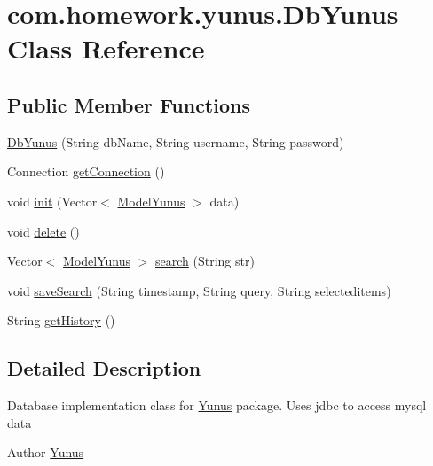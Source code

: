 \hypertarget{classcom_1_1homework_1_1yunus_1_1_db_yunus}{}\section{com.\+homework.\+yunus.\+Db\+Yunus Class Reference}
\label{classcom_1_1homework_1_1yunus_1_1_db_yunus}
\subsection*{Public Member Functions}
\begin{DoxyCompactItemize}
\item 
\hyperlink{classcom_1_1homework_1_1yunus_1_1_db_yunus_a0471eb6b18272009f3bd3728510f4c6c}{Db\+Yunus} (String db\+Name, String username, String password)
\item 
Connection \hyperlink{classcom_1_1homework_1_1yunus_1_1_db_yunus_a5cdbf15a8027a2d8ff2201d451e12297}{get\+Connection} ()
\item 
void \hyperlink{classcom_1_1homework_1_1yunus_1_1_db_yunus_af545ad91b2ddf224346cb4914bd36583}{init} (Vector$<$ \hyperlink{classcom_1_1homework_1_1yunus_1_1_model_yunus}{Model\+Yunus} $>$ data)
\item 
void \hyperlink{classcom_1_1homework_1_1yunus_1_1_db_yunus_ac0f46ce9c1b762a530e4f19fae4e0f01}{delete} ()
\item 
Vector$<$ \hyperlink{classcom_1_1homework_1_1yunus_1_1_model_yunus}{Model\+Yunus} $>$ \hyperlink{classcom_1_1homework_1_1yunus_1_1_db_yunus_a3010b549e3a1b7b21d63c65f66d5a7eb}{search} (String str)
\item 
void \hyperlink{classcom_1_1homework_1_1yunus_1_1_db_yunus_a36c0889028f98b4c5d823f17c3efbd71}{save\+Search} (String timestamp, String query, String selecteditems)
\item 
String \hyperlink{classcom_1_1homework_1_1yunus_1_1_db_yunus_a35f377c750efbe182daa17daaf9af672}{get\+History} ()
\end{DoxyCompactItemize}


\subsection{Detailed Description}
Database implementation class for \hyperlink{classcom_1_1homework_1_1yunus_1_1_yunus}{Yunus} package. Uses jdbc to access mysql data \begin{DoxyAuthor}{Author}
\hyperlink{classcom_1_1homework_1_1yunus_1_1_yunus}{Yunus} 
\end{DoxyAuthor}


